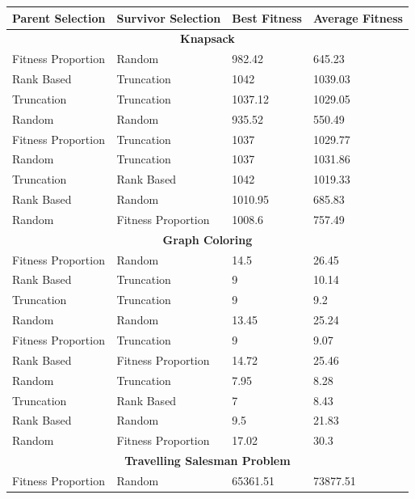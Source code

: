 \documentclass[11pt, letterpaper]{article}
\begin{document}
\begin{table}[H]
    \centering
    \begin{tabular}{|l|l|l|l|}
    \hline
        \textbf{Parent Selection} & \textbf{Survivor Selection} & \textbf{Best Fitness} & \textbf{Average Fitness} \\ \hline
        \multicolumn{4}{|c|}{\textbf{Knapsack}} \\ \hline
        Fitness Proportion & Random & 982.42 & 645.23 \\ \hline
        Rank Based & Truncation & 1042 & 1039.03 \\ \hline
        Truncation & Truncation & 1037.12 & 1029.05 \\ \hline
        Random & Random & 935.52 & 550.49 \\ \hline
        Fitness Proportion & Truncation & 1037 & 1029.77 \\ \hline
        Random & Truncation & 1037 & 1031.86 \\ \hline
        Truncation & Rank Based & 1042 & 1019.33 \\ \hline
        Rank Based & Random & 1010.95 & 685.83 \\ \hline
        Random & Fitness Proportion & 1008.6 & 757.49 \\ \hline
        \multicolumn{4}{|c|}{\textbf{Graph Coloring}} \\ \hline
        Fitness Proportion & Random & 14.5 & 26.45 \\ \hline
        Rank Based & Truncation & 9 & 10.14 \\ \hline
        Truncation & Truncation & 9 & 9.2 \\ \hline
        Random & Random & 13.45 & 25.24 \\ \hline
        Fitness Proportion & Truncation & 9 & 9.07 \\ \hline
        Rank Based & Fitness Proportion & 14.72 & 25.46 \\ \hline
        Random & Truncation & 7.95 & 8.28 \\ \hline
        Truncation & Rank Based & 7 & 8.43 \\ \hline
        Rank Based & Random & 9.5 & 21.83 \\ \hline
        Random & Fitness Proportion & 17.02 & 30.3 \\ \hline
        \multicolumn{4}{|c|}{\textbf{Travelling Salesman Problem}} \\ \hline
        Fitness Proportion & Random & 65361.51 & 73877.51 \\ \hline

\end{tabular}
\end{table}
\end{document}
